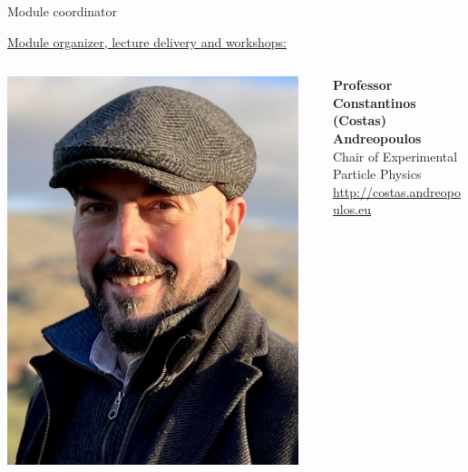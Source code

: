 \begin{frame}{Module coordinator}

\vspace{0.3cm}

\underline{Module organizer, lecture delivery and workshops:}\\
\vspace{0.2cm}
\begin{columns}
  \begin{column}{0.20\textwidth}
   \begin{center}
     \includegraphics[width=0.95\textwidth]{./images/people/andreopoulos2}\\
   \end{center}
  \end{column}
  \begin{column}{0.80\textwidth}
    {\bf Professor Constantinos (Costas) Andreopoulos}\\
    Chair of Experimental Particle Physics\\
    \vspace{0.2cm}
    {\color{blue} \url{http://costas.andreopoulos.eu}}\\
  \end{column}
\end{columns}


\end{frame}
